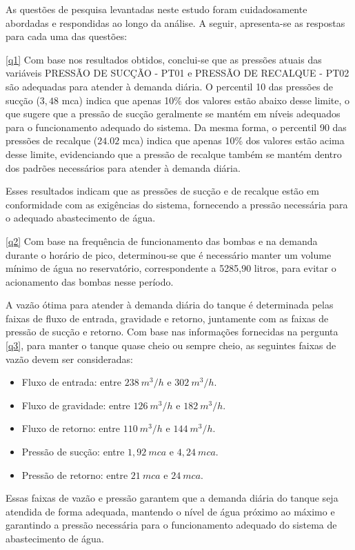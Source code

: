 As questões de pesquisa levantadas neste estudo foram cuidadosamente abordadas e respondidas ao longo da análise. A seguir, apresenta-se as respostas para cada uma das questões:

\ref{q1} Com base nos resultados obtidos, conclui-se que as pressões atuais das variáveis PRESSÃO DE SUCÇÃO - PT01 e PRESSÃO DE RECALQUE - PT02 são adequadas para atender à demanda diária. O percentil 10 das pressões de sucção ($3,48$ mca) indica que apenas 10\% dos valores estão abaixo desse limite, o que sugere que a pressão de sucção geralmente se mantém em níveis adequados para o funcionamento adequado do sistema. Da mesma forma, o percentil 90 das pressões de recalque ($24.02$ mca) indica que apenas 10\% dos valores estão acima desse limite, evidenciando que a pressão de recalque também se mantém dentro dos padrões necessários para atender à demanda diária.

Esses resultados indicam que as pressões de sucção e de recalque estão em conformidade com as exigências do sistema, fornecendo a pressão necessária para o adequado abastecimento de água.

\ref{q2} Com base na frequência de funcionamento das bombas e na demanda durante o horário de pico, determinou-se que é necessário manter um volume mínimo de água no reservatório, correspondente a 5285,90 litros, para evitar o acionamento das bombas nesse período.

A vazão ótima para atender à demanda diária do tanque é determinada pelas faixas de fluxo de entrada, gravidade e retorno, juntamente com as faixas de pressão de sucção e retorno. Com base nas informações fornecidas na pergunta \ref{q3}, para manter o tanque quase cheio ou sempre cheio, as seguintes faixas de vazão devem ser consideradas:

\begin{itemize}
	\item Fluxo de entrada: entre $238 \ m^3/h$ e $302 \ m^3/h$.
	\item Fluxo de gravidade: entre $126 \ m^3/h$ e $182 \ m^3/h$.
	\item Fluxo de retorno: entre $110 \ m^3/h$ e $144 \ m^3/h$.
	\item Pressão de sucção: entre $1,92 \ mca$ e $4,24 \ mca$.
	\item Pressão de retorno: entre $21 \ mca$ e $24 \ mca$.
\end{itemize}

Essas faixas de vazão e pressão garantem que a demanda diária do tanque seja atendida de forma adequada, mantendo o nível de água próximo ao máximo e garantindo a pressão necessária para o funcionamento adequado do sistema de abastecimento de água.


